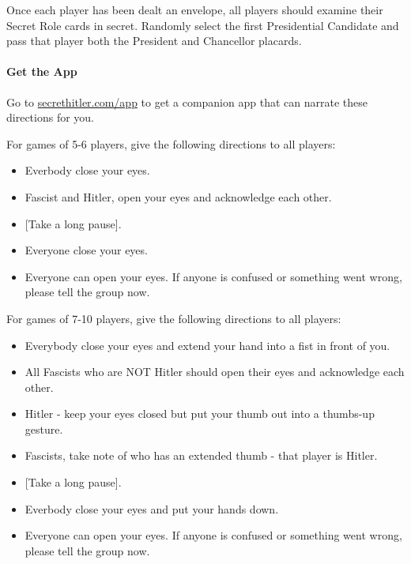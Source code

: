 \documentclass[13pt,a4paper,twocolumn,titlepage]{scrartcl}
\begin{document}
	Once each player has been dealt an envelope, all players should examine their Secret Role cards in secret. Randomly select the first Presidential Candidate and pass that player both the President and Chancellor placards.
	
	\vspace*{-8mm}
	\paragraph{\textcolor{SeaGreen4}{Get the App}}
	\textcolor{SeaGreen4}{Go to \url{secrethitler.com/app} to get a companion app that can narrate these directions for you.}
	
	\textcolor{Blue3}{For games of 5-6 players}, give the following directions to all players:
	\begin{itemize}
		\item Everbody close your eyes.
		\item \textcolor{fascist}{Fascist} and \textcolor{fascist}{Hitler}, open your eyes and acknowledge each other.
		\item $\phantom{}$[Take a long pause].
		\item Everyone close your eyes.
		\item Everyone can open your eyes. If anyone is confused or something went wrong, please tell the group now.
	\end{itemize}

		\textcolor{Blue3}{For games of 7-10 players}, give the following directions to all players:
	\begin{itemize}
		\item Everybody close your eyes and extend your hand into a fist in front of you.
		\item All \textcolor{fascist}{Fascists} who are NOT \textcolor{fascist}{Hitler} should open their eyes and acknowledge each other.
		\item \textcolor{fascist}{Hitler} - keep your eyes closed but put your thumb out into a thumbs-up gesture.
		\item \textcolor{fascist}{Fascists}, take note of who has an extended thumb - that player is \textcolor{fascist}{Hitler}.
		\item $\phantom{}$[Take a long pause].
		\item Everbody close your eyes and put your hands down.
		\item Everyone can open your eyes. If anyone is confused or something went wrong, please tell the group now.
	\end{itemize}
	
\end{document}
